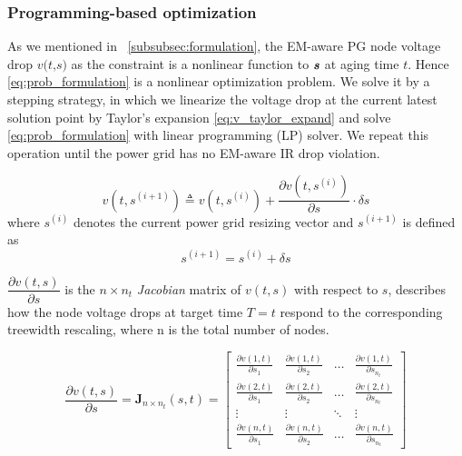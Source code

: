 \subsubsection{Programming-based optimization}
\label{subsubsec:slp_framework}

As we mentioned in ~\ref{subsubsec:formulation}, the EM-aware PG node voltage drop $\textit{v(t,s)}$ as the constraint is a nonlinear function to $\textit{\textbf{s}}$ at aging time $\textit{t}$. Hence \eqref{eq:prob_formulation} is a nonlinear optimization problem. 
We solve it by a stepping strategy, in which we linearize the voltage drop at the current latest solution point by Taylor's expansion \eqref{eq:v_taylor_expand} and solve \eqref{eq:prob_formulation} with linear programming (LP) solver. We repeat this operation until the power grid has no EM-aware IR drop violation.

\begin{equation}
	\label{eq:v_taylor_expand}
	v(t, s^{(i+1)}) \triangleq v(t,s^{(i)}) + \dfrac{\partial v(t, s^{(i)})}{\partial s} \cdot \delta s
\end{equation}
where $s^{(i)}$ denotes the current power grid resizing vector and $s^{(i+1)}$ is defined as 
\begin{equation}
	\label{eq:s}
	s^{(i+1)} = s^{(i)} + \delta s 
\end{equation}

$ \dfrac{\partial v(t, s)}{\partial s}$ is the $n\times n_{t}$ \textit{Jacobian} matrix of $v(t,s)$ with respect to $s$, describes how the node voltage drops at target time $T=t$ respond to the corresponding treewidth rescaling, where n is the total number of nodes. 

\begin{equation}
	\label{eq:J_matrix}
	\dfrac{\partial v(t, s)}{\partial s}=
	\mathbf {J}_{n\times n_{t}}(s,t) =
	\begin{bmatrix}
		\frac{\partial v(1,t)}{\partial s_{1}}&\frac{\partial v(1,t)}{\partial s_{2}}&\ldots&\frac{\partial v(1,t)}{\partial s_{n_{t}}}\\
		\frac{\partial v(2,t)}{\partial s_{1}}&\frac{\partial v(2,t)}{\partial s_{2}}&\ldots&\frac{\partial v(2,t)}{\partial s_{n_{t}}}\\
		\vdots&\vdots&\ddots&\vdots\\
		\frac{\partial v(n,t)}{\partial s_{1}}&\frac{\partial v(n,t)}{\partial s_{2}}&\ldots&\frac{\partial v(n,t)}{\partial s_{n_{t}}}
	\end{bmatrix}
\end{equation}



